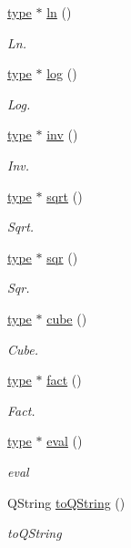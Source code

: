 \begin{DoxyCompactItemize}
\hyperlink{classtype}{type} $\ast$ \hyperlink{classentier_aef2c65b9f379c5ea7857fcaabca30dba}{ln} ()
\begin{DoxyCompactList}\small\item\em Ln. \end{DoxyCompactList}\item 
\hyperlink{classtype}{type} $\ast$ \hyperlink{classentier_aeca6cf72ceaa32cfc7b52f00d962d3cc}{log} ()
\begin{DoxyCompactList}\small\item\em Log. \end{DoxyCompactList}\item 
\hyperlink{classtype}{type} $\ast$ \hyperlink{classentier_abaa5775172cf9c417ccdb174304056b3}{inv} ()
\begin{DoxyCompactList}\small\item\em Inv. \end{DoxyCompactList}\item 
\hyperlink{classtype}{type} $\ast$ \hyperlink{classentier_a9058b76c3fae96fb3a9ade24e6c33926}{sqrt} ()
\begin{DoxyCompactList}\small\item\em Sqrt. \end{DoxyCompactList}\item 
\hyperlink{classtype}{type} $\ast$ \hyperlink{classentier_a33b0b2b13a0fdc767a809df33b934dd6}{sqr} ()
\begin{DoxyCompactList}\small\item\em Sqr. \end{DoxyCompactList}\item 
\hyperlink{classtype}{type} $\ast$ \hyperlink{classentier_a4c726d947d2f7464ec858f50054118e8}{cube} ()
\begin{DoxyCompactList}\small\item\em Cube. \end{DoxyCompactList}\item 
\hyperlink{classtype}{type} $\ast$ \hyperlink{classentier_a8a475a326fc2c4e1b2a03ec437270144}{fact} ()
\begin{DoxyCompactList}\small\item\em Fact. \end{DoxyCompactList}\item 
\hyperlink{classtype}{type} $\ast$ \hyperlink{classentier_aff68ab5a1784c8a4cece781412f93aec}{eval} ()
\begin{DoxyCompactList}\small\item\em eval \end{DoxyCompactList}\item 
Q\-String \hyperlink{classentier_a47b7c0d899f24e9117e123165648686b}{to\-Q\-String} ()
\begin{DoxyCompactList}\small\item\em to\-Q\-String \end{DoxyCompactList}\end{DoxyCompactItemize}
